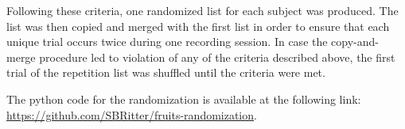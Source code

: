 \documentclass[
  12pt,
]{article}
\begin{document}
Following these criteria, one randomized list for each subject was produced.
The list was then copied and merged with the first list in order to ensure that each unique trial occurs twice during one recording session.
In case the copy-and-merge procedure led to violation of any of the criteria described above, the first trial of the repetition list was shuffled until the criteria were met.

The python code for the randomization is available at the following link: \url{https://github.com/SBRitter/fruits-randomization}.
\end{document}
